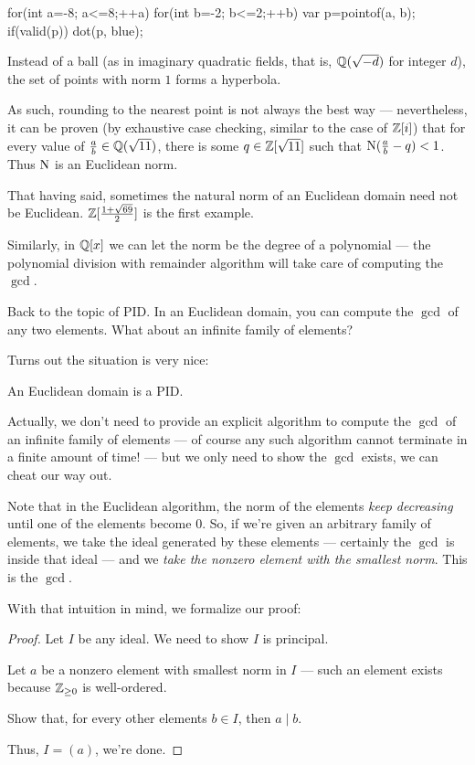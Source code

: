 \begin{example}
\begin{center}
\begin{asy}
		for(int a=-8; a<=8;++a){
			for(int b=-2; b<=2;++b){
				var p=pointof(a, b);
				if(valid(p)) dot(p, blue);
			}
		}
	\end{asy}
	\end{center}

	Instead of a ball (as in imaginary quadratic fields, that is, $\mathbb Q(\sqrt{-d})$ for integer $d$),
	the set of points with norm $1$ forms a hyperbola.

	As such, rounding to the nearest point is not always the best way --- nevertheless, it can be
	proven (by exhaustive case checking, similar to the case of $\mathbb Z[i]$) that for every value of
	$\frac{a}{b} \in \mathbb Q(\sqrt{11})$, there is some $q \in \mathbb Z[\sqrt{11}]$ such that
	$\operatorname{N}(\frac{a}{b}-q) < 1$. Thus $\operatorname{N}$ is an Euclidean norm.
\end{example}

That having said, sometimes the natural norm of an Euclidean domain need not be Euclidean.
$\mathbb Z[\frac{1 + \sqrt{69}}{2}]$ is the first example.

\begin{example}
	Similarly, in $\mathbb Q[x]$ we can let the norm be the degree of a polynomial --- the polynomial
	division with remainder algorithm will take care of computing the $\gcd$.
\end{example}

Back to the topic of PID. In an Euclidean domain, you can compute the $\gcd$ of any two elements.
What about an infinite family of elements?

Turns out the situation is very nice:
\begin{proposition}
	An Euclidean domain is a PID.
\end{proposition}
Actually, we don't need to provide an explicit algorithm to compute the $\gcd$ of an infinite family
of elements --- of course any such algorithm cannot terminate in a finite amount of time! --- but we
only need to show the $\gcd$ exists, we can cheat our way out.

Note that in the Euclidean algorithm, the norm of the elements \emph{keep decreasing} until one of
the elements become $0$. So, if we're given an arbitrary family of elements, we take the ideal
generated by these elements --- certainly the $\gcd$ is inside that ideal --- and we \emph{take the
nonzero element with the smallest norm}. This is the $\gcd$.

With that intuition in mind, we formalize our proof:
\begin{proof}
	Let $I$ be any ideal. We need to show $I$ is principal.

	Let $a$ be a nonzero element with smallest norm in $I$ --- such an element exists because
	$\mathbb Z_{\geq 0}$ is well-ordered.
	\begin{ques}
		Show that, for every other elements $b \in I$, then $a \mid b$.
	\end{ques}
	Thus, $I = (a)$, we're done.
\end{proof}


